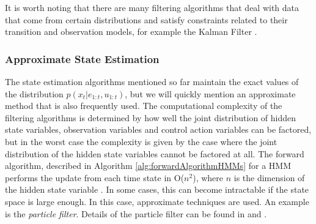 
It is worth noting that there are many filtering algorithms that deal with data that come from certain distributions and satisfy constraints related to their transition and observation models, for example the Kalman Filter \cite[p.~43]{Thrun:2005:ProbabilisticRobotics}.







\subsubsection{Approximate State Estimation}
The state estimation algorithms mentioned so far maintain the exact values of the distribution $p(x_t | e_{1:t}, u_{1:t})$, but we will quickly mention an approximate method that is also frequently used. The computational complexity of the filtering algorithms is determined by how well the joint distribution of hidden state variables, observation variables and control action variables can be factored, but in the worst case the complexity is given by the case where the joint distribution of the hidden state variables cannot be factored at all. The forward algorithm, described in Algorithm \ref{alg:forwardAlgorithmHMMs} for a HMM performs the update from each time state in O($n^2$), where $n$ is the dimension of the hidden state variable \cite{Smyth1997ProbabilisticModels}.
In some cases, this can become intractable if the state space is large enough. %
In this case, approximate techniques are used. An example is the \textit{particle filter}. Details of the particle filter can be found in \cite[p.~96]{Thrun:2005:ProbabilisticRobotics} and \cite[p.~665]{KollerPGM}.
